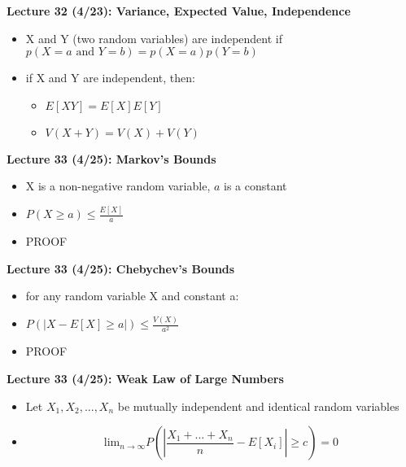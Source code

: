 \documentclass[twocolumn]{article}
\begin{document}
\textbf{Lecture 32 (4/23): Variance, Expected Value, Independence}
\begin{itemize}
    \item X and Y (two random variables) are independent if $p(X=a \text{ and } Y=b)=p(X=a)p(Y=b)$
    \item if X and Y are independent, then:
    \begin{itemize}
        \item $E[XY]=E[X]E[Y]$
        \item $V(X+Y)=V(X)+V(Y)$
    \end{itemize}
\end{itemize}

\textbf{Lecture 33 (4/25): Markov's Bounds}
\begin{itemize}
    \item X is a non-negative random variable, $a$ is a constant
    \item $P(X \geq a) \leq \frac{E[X]}{a}$
    \item PROOF
\end{itemize}

\textbf{Lecture 33 (4/25): Chebychev's Bounds}
\begin{itemize}
    \item for any random variable X and constant a:
    \item $P(|X-E[X]\geq a|) \leq \frac{V(X)}{a^2}$
    \item PROOF
\end{itemize}

\textbf{Lecture 33 (4/25): Weak Law of Large Numbers}
\begin{itemize}
    \item Let $X_1, X_2, ..., X_n$ be mutually independent and identical random variables
    \item $$\text{lim}_{n \rightarrow \infty}P(|\frac{X_1+...+X_n}{n}-E[X_i]|\geq c)=0$$
\end{itemize}
\end{document}
